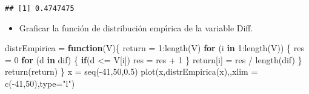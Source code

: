 \documentclass[
]{article}
\newenvironment{Shaded}{\begin{snugshade}}{\end{snugshade}}
\newcommand{\AttributeTok}[1]{\textcolor[rgb]{0.77,0.63,0.00}{#1}}
\newcommand{\ControlFlowTok}[1]{\textcolor[rgb]{0.13,0.29,0.53}{\textbf{#1}}}
\newcommand{\DecValTok}[1]{\textcolor[rgb]{0.00,0.00,0.81}{#1}}
\newcommand{\FloatTok}[1]{\textcolor[rgb]{0.00,0.00,0.81}{#1}}
\newcommand{\FunctionTok}[1]{\textcolor[rgb]{0.00,0.00,0.00}{#1}}
\newcommand{\NormalTok}[1]{#1}
\newcommand{\OtherTok}[1]{\textcolor[rgb]{0.56,0.35,0.01}{#1}}
\newcommand{\SpecialCharTok}[1]{\textcolor[rgb]{0.00,0.00,0.00}{#1}}
\newcommand{\StringTok}[1]{\textcolor[rgb]{0.31,0.60,0.02}{#1}}
\providecommand{\tightlist}{%
  \setlength{\itemsep}{0pt}\setlength{\parskip}{0pt}}
\begin{document}
\begin{Shaded}
\end{Shaded}

\begin{verbatim}
## [1] 0.4747475
\end{verbatim}

\begin{itemize}
\tightlist
\item
  Graficar la función de distribución empı́rica de la variable Diff.
\end{itemize}

\begin{Shaded}
\begin{Highlighting}[]
\NormalTok{distrEmpirica }\OtherTok{=} \ControlFlowTok{function}\NormalTok{(V)\{}
\NormalTok{  return }\OtherTok{=} \DecValTok{1}\SpecialCharTok{:}\FunctionTok{length}\NormalTok{(V)}
  \ControlFlowTok{for}\NormalTok{ (i }\ControlFlowTok{in} \DecValTok{1}\SpecialCharTok{:}\FunctionTok{length}\NormalTok{(V)) \{}
\NormalTok{    res }\OtherTok{=} \DecValTok{0}
    \ControlFlowTok{for}\NormalTok{ (d }\ControlFlowTok{in}\NormalTok{ dif) \{}
      \ControlFlowTok{if}\NormalTok{(d }\SpecialCharTok{\textless{}=}\NormalTok{ V[i]) res }\OtherTok{=}\NormalTok{ res }\SpecialCharTok{+} \DecValTok{1}
\NormalTok{    \}}
\NormalTok{    return[i] }\OtherTok{=}\NormalTok{ res }\SpecialCharTok{/} \FunctionTok{length}\NormalTok{(dif)}
\NormalTok{  \}}
  \FunctionTok{return}\NormalTok{(return)}
\NormalTok{\}}
\NormalTok{x }\OtherTok{=} \FunctionTok{seq}\NormalTok{(}\SpecialCharTok{{-}}\DecValTok{41}\NormalTok{,}\DecValTok{50}\NormalTok{,}\FloatTok{0.5}\NormalTok{)}
\FunctionTok{plot}\NormalTok{(x,}\FunctionTok{distrEmpirica}\NormalTok{(x),,}\AttributeTok{xlim =} \FunctionTok{c}\NormalTok{(}\SpecialCharTok{{-}}\DecValTok{41}\NormalTok{,}\DecValTok{50}\NormalTok{),}\AttributeTok{type=}\StringTok{"l"}\NormalTok{)}
\end{Highlighting}
\end{Shaded}
\end{document}
